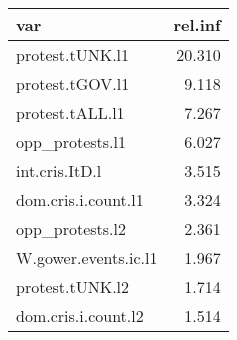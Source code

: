 \begin{tabular}{lr}
  \hline
var & rel.inf \\ 
  \hline
protest.tUNK.l1 & 20.310 \\ 
  protest.tGOV.l1 & 9.118 \\ 
  protest.tALL.l1 & 7.267 \\ 
  opp\_protests.l1 & 6.027 \\ 
  int.cris.ItD.l & 3.515 \\ 
  dom.cris.i.count.l1 & 3.324 \\ 
  opp\_protests.l2 & 2.361 \\ 
  W.gower.events.ic.l1 & 1.967 \\ 
  protest.tUNK.l2 & 1.714 \\ 
  dom.cris.i.count.l2 & 1.514 \\ 
   \hline
\end{tabular}
